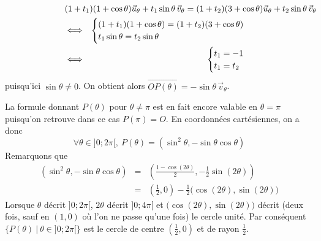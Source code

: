 {{\begin{itemize}
\begin{eqnarray*}
\lefteqn{(1+t_1)(1+\cos\theta)\vec{u}_\theta+t_1\sin\theta\,\vec{v}_\theta=(1+t_2)(3+\cos\theta)\vec{u}_\theta+t_2\sin\theta\,\vec{v}_\theta}\\
&\Longleftrightarrow& \begin{cases}(1+t_1)(1+\cos\theta)=(1+t_2)(3+\cos\theta)\cr t_1\sin\theta=t_2\sin\theta\end{cases}\\
&\Longleftrightarrow& \begin{cases}t_1=-1\cr t_1=t_2\end{cases}
\end{eqnarray*}
puisqu'ici $\sin\theta\not=0$. 
On obtient alors $\overrightarrow{OP(\theta)}=-\sin\theta\,\vec{v}_\theta$. 
\end{itemize}

La formule donnant $P(\theta)$ pour $\theta\not=\pi$ est en fait encore valable en $\theta=\pi$ puisqu'on retrouve dans ce cas $P(\pi)=O$. En coordonnées cartésiennes, on a donc
$$\forall\theta\in]0;2\pi[,\ P(\theta)=(\sin^2\theta, -\sin\theta\cos\theta)$$
Remarquons que 
\begin{eqnarray*}
(\sin^2\theta, -\sin\theta\cos\theta)&=&\left(\frac{1-\cos(2\theta)}{2},-\frac{1}{2}\sin(2\theta)\right)\\
 &=&\left(\frac{1}{2},0\right)-\frac{1}{2}\big(\cos(2\theta),\sin(2\theta)\big)
\end{eqnarray*}
Lorsque $\theta$ décrit $]0;2\pi[$, $2\theta$ décrit $]0;4\pi[$ et 
$\big(\cos(2\theta),\sin(2\theta)\big)$ décrit (deux fois, sauf en $(1,0)$ où l'on ne passe 
qu'une fois) le cercle unité. Par conséquent $\{P(\theta)\ |\ \theta\in]0;2\pi[\}$ 
est le cercle de centre $(\frac{1}{2},0)$ et de rayon $\frac{1}{2}$.

\begin{center}
\end{center}}}
